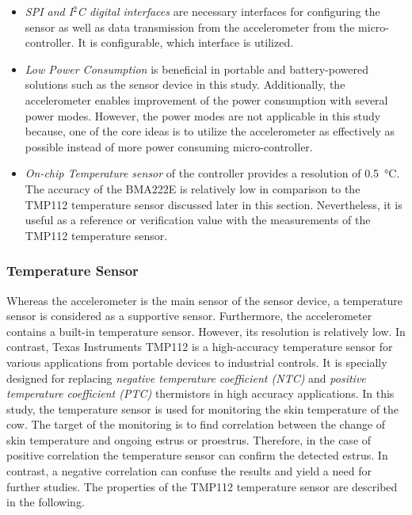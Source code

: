 \documentclass[english,12pt,a4paper,pdftex,elec,utf8]{aaltothesis}
\begin{document}
\begin{itemize}
\item \textit{SPI and I$^2$C digital interfaces} are necessary interfaces for configuring the sensor as well as data transmission from the accelerometer from the micro-controller. It is configurable, which interface is utilized.

\item \textit{Low Power Consumption} is beneficial in portable and battery-powered solutions such as the sensor device in this study. Additionally, the accelerometer enables improvement of the power consumption with several power modes. However, the power modes are not applicable in this study because, one of the core ideas is to utilize the accelerometer as effectively as possible instead of more  power consuming micro-controller.
 
\item \textit{On-chip Temperature sensor} of the controller provides a resolution of \SI{0.5}{\celsius}. The accuracy of the BMA222E is relatively low in comparison to the TMP112 temperature sensor discussed later in this section. Nevertheless, it is useful as a reference or verification value with the measurements of the TMP112 temperature sensor. \cite{bma222datasheet}

\end{itemize}


\subsubsection*{Temperature Sensor}

Whereas the accelerometer is the main sensor of the sensor device, a temperature sensor is considered as a supportive sensor. Furthermore, the accelerometer contains a built-in temperature sensor. However, its resolution is relatively low. In contrast, Texas Instruments TMP112 is a high-accuracy temperature sensor for various applications from portable devices to industrial controls.  It is specially designed for replacing \textit{negative temperature coefficient (NTC)} and \textit{positive temperature coefficient (PTC)} thermistors in high accuracy applications. In this study, the temperature sensor is used for monitoring the skin temperature of the cow. The target of the monitoring is to find correlation between the change of skin temperature and ongoing estrus or proestrus. Therefore, in the case of positive correlation the temperature sensor can confirm the detected estrus. In contrast, a negative correlation can confuse the results and yield a need for further studies. The properties of the TMP112 temperature sensor are described in the following.
\end{document}
